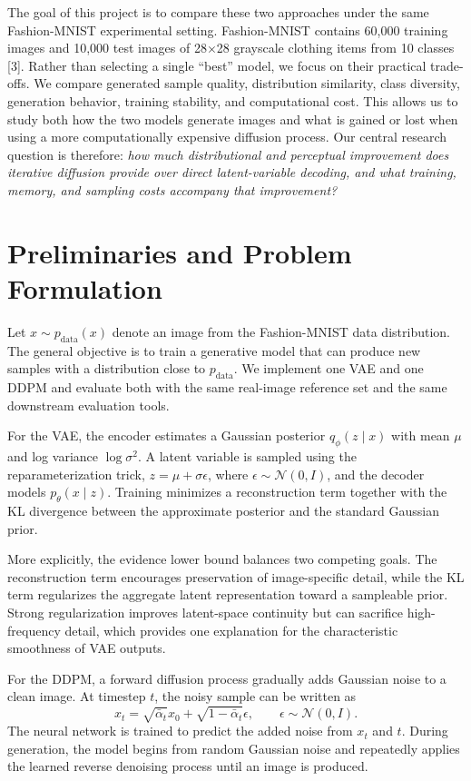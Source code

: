 \documentclass{article}
\begin{document}
The goal of this project is to compare these two approaches under the same Fashion-MNIST experimental setting. Fashion-MNIST contains 60,000 training images and 10,000 test images of 28$\times$28 grayscale clothing items from 10 classes [3]. Rather than selecting a single ``best'' model, we focus on their practical trade-offs. We compare generated sample quality, distribution similarity, class diversity, generation behavior, training stability, and computational cost. This allows us to study both how the two models generate images and what is gained or lost when using a more computationally expensive diffusion process. Our central research question is therefore: \emph{how much distributional and perceptual improvement does iterative diffusion provide over direct latent-variable decoding, and what training, memory, and sampling costs accompany that improvement?}

\section{Preliminaries and Problem Formulation}
Let $x \sim p_{\mathrm{data}}(x)$ denote an image from the Fashion-MNIST data distribution. The general objective is to train a generative model that can produce new samples with a distribution close to $p_{\mathrm{data}}$. We implement one VAE and one DDPM and evaluate both with the same real-image reference set and the same downstream evaluation tools.

For the VAE, the encoder estimates a Gaussian posterior $q_\phi(z\mid x)$ with mean $\mu$ and log variance $\log\sigma^2$. A latent variable is sampled using the reparameterization trick, $z=\mu+\sigma\epsilon$, where $\epsilon\sim\mathcal{N}(0,I)$, and the decoder models $p_\theta(x\mid z)$. Training minimizes a reconstruction term together with the KL divergence between the approximate posterior and the standard Gaussian prior.

More explicitly, the evidence lower bound balances two competing goals. The reconstruction term encourages preservation of image-specific detail, while the KL term regularizes the aggregate latent representation toward a sampleable prior. Strong regularization improves latent-space continuity but can sacrifice high-frequency detail, which provides one explanation for the characteristic smoothness of VAE outputs.

For the DDPM, a forward diffusion process gradually adds Gaussian noise to a clean image. At timestep $t$, the noisy sample can be written as
\begin{equation}
 x_t=\sqrt{\bar{\alpha}_t}x_0+\sqrt{1-\bar{\alpha}_t}\epsilon,
 \qquad \epsilon\sim\mathcal{N}(0,I).
\end{equation}
The neural network is trained to predict the added noise from $x_t$ and $t$. During generation, the model begins from random Gaussian noise and repeatedly applies the learned reverse denoising process until an image is produced.
\end{document}
